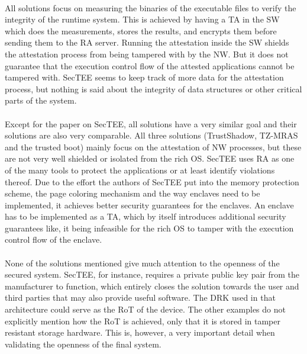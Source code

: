 \paragraph*{}
All solutions focus on measuring the binaries of the executable files to verify the integrity of the runtime system. This is achieved by having a TA in the SW which does the measurements, stores the results, and encrypts them before sending them to the RA server. Running the attestation inside the SW shields the attestation process from being tampered with by the NW. But it does not guarantee that the execution control flow of the attested applications cannot be tampered with. SecTEE seems to keep track of more data for the attestation process, but nothing is said about the integrity of data structures or other critical parts of the system. 

\paragraph*{}
Except for the paper on SecTEE, all solutions have a very similar goal and their solutions are also very comparable. All three solutions (TrustShadow, TZ-MRAS and the trusted boot) mainly focus on the attestation of NW processes, but these are not very well shielded or isolated from the rich OS. SecTEE uses RA as one of the many tools to protect the applications or at least identify violations thereof. Due to the effort the authors of SecTEE put into the memory protection scheme, the page coloring mechanism and the way enclaves need to be implemented, it achieves better security guarantees for the enclaves. An enclave has to be implemented as a TA, which by itself introduces additional security guarantees like, it being infeasible for the rich OS to tamper with the execution control flow of the enclave.

\paragraph*{}
None of the solutions mentioned give much attention to the openness of the secured system. SecTEE, for instance, requires a private public key pair from the manufacturer to function, which entirely closes the solution towards the user and third parties that may also provide useful software. The DRK used in that architecture could serve as the RoT of the device. The other examples do not explicitly mention how the RoT is achieved, only that it is stored in tamper resistant storage hardware. This is, however, a very important detail when validating the openness of the final system.

